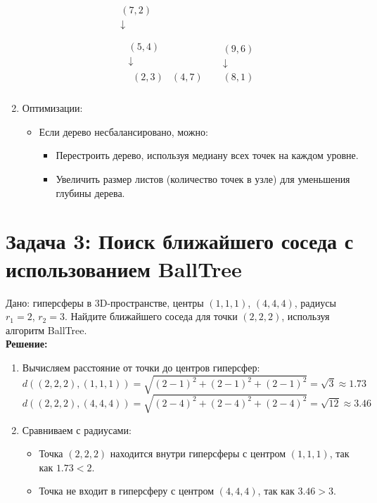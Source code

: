 \begin{enumerate}
            \[
\begin{array}{c}
    (7, 2)\\
    \downarrow\\
    \begin{array}{cc}
        \text{} & \text{} \\
        \begin{array}{c}
            (5, 4) \\
            \downarrow \\
            \begin{array}{cc}
                (2, 3) & (4, 7)
            \end{array}
        \end{array}
        &
        \begin{array}{c}
            (9, 6) \\
            \downarrow \\
            (8, 1)
        \end{array}
    \end{array}
\end{array}
\]
    \item Оптимизации:
    \begin{itemize}
        \item Если дерево несбалансировано, можно:
        \begin{itemize}
            \item Перестроить дерево, используя медиану всех точек на каждом уровне.
            \item Увеличить размер листов (количество точек в узле) для уменьшения глубины дерева.
        \end{itemize}
    \end{itemize}
\end{enumerate}

\section*{Задача 3: Поиск ближайшего соседа с использованием BallTree}

Дано: гиперсферы в 3D-пространстве, центры \((1, 1, 1)\), \((4, 4, 4)\), радиусы \(r_1 = 2\), \(r_2 = 3\). Найдите ближайшего соседа для точки \((2, 2, 2)\), используя алгоритм BallTree.\\
\textbf{Решение:}
\begin{enumerate}
    \item Вычисляем расстояние от точки до центров гиперсфер:
    \[
    d((2, 2, 2), (1, 1, 1)) = \sqrt{(2-1)^2 + (2-1)^2 + (2-1)^2} = \sqrt{3} \approx 1.73
    \]
    \[
    d((2, 2, 2), (4, 4, 4)) = \sqrt{(2-4)^2 + (2-4)^2 + (2-4)^2} = \sqrt{12} \approx 3.46
    \]
    \item Сравниваем с радиусами:
    \begin{itemize}
        \item Точка \((2, 2, 2)\) находится внутри гиперсферы с центром \((1, 1, 1)\), так как \(1.73 < 2\).
        \item Точка не входит в гиперсферу с центром \((4, 4, 4)\), так как \(3.46 > 3\).
    \end{itemize}
\end{enumerate}

